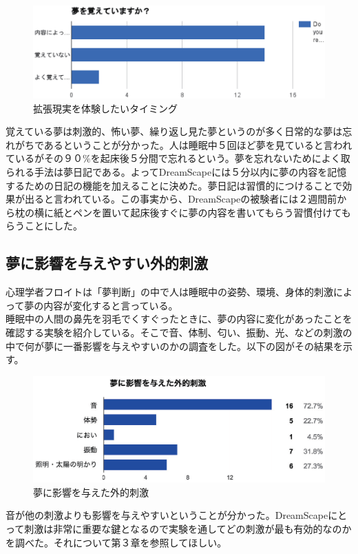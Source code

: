\begin{figure}[htbp]
\begin{center}
\includegraphics[width=15cm]{eps/remember.eps}
\caption{拡張現実を体験したいタイミング}
\label{拡張現実を体験したいタイミング}
\end{center}
\end{figure}

覚えている夢は刺激的、怖い夢、繰り返し見た夢というのが多く日常的な夢は忘れがちであるということが分かった。人は睡眠中５回ほど夢を見ていると言われているがその９０\%を起床後５分間で忘れるという。夢を忘れないためによく取られる手法は夢日記である\cite{forgetDreams}。よってDreamScapeには５分以内に夢の内容を記憶するための日記の機能を加えることに決めた。夢日記は習慣的につけることで効果が出ると言われている。この事実から、DreamScapeの被験者には２週間前から枕の横に紙とペンを置いて起床後すぐに夢の内容を書いてもらう習慣付けてもらうことにした。

\subsection{夢に影響を与えやすい外的刺激}
心理学者フロイトは「夢判断」の中で人は睡眠中の姿勢、環境、身体的刺激によって夢の内容が変化すると言っている\cite{freud}。\\
睡眠中の人間の鼻先を羽毛でくすぐったときに、夢の内容に変化があったことを確認する実験を紹介している。そこで音、体制、匂い、振動、光、などの刺激の中で何が夢に一番影響を与えやすいのかの調査をした。以下の図がその結果を示す。
\begin{figure}[htbp]
\begin{center}
\includegraphics[width=15cm]{eps/input.eps}
\caption{夢に影響を与えた外的刺激}
\label{夢に影響を与えた外的刺激}
\end{center}
\end{figure}
音が他の刺激よりも影響を与えやすいということが分かった。DreamScapeにとって刺激は非常に重要な鍵となるので実験を通してどの刺激が最も有効的なのかを調べた。それについて第３章を参照してほしい。

